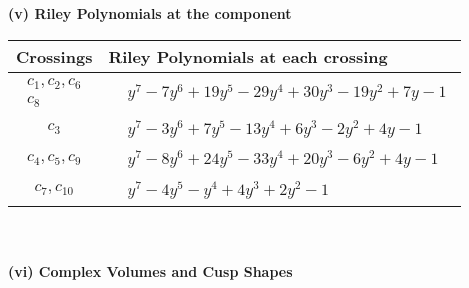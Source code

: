 \documentclass[1p]{elsarticle_modified}
\theoremstyle{definition}
\begin{document}
\flushleft \textbf{(v) Riley Polynomials at the component}\newline \\
\begin{tabular}{m{50pt}|m{274pt}}
Crossings & \hspace{64pt}Riley Polynomials at each crossing \\
\hline $$\begin{aligned}c_{1},c_{2},c_{6}\\c_{8}\end{aligned}$$&$\begin{aligned}
&y^7-7 y^6+19 y^5-29 y^4+30 y^3-19 y^2+7 y-1
\end{aligned}$\\
\hline $$\begin{aligned}c_{3}\end{aligned}$$&$\begin{aligned}
&y^7-3 y^6+7 y^5-13 y^4+6 y^3-2 y^2+4 y-1
\end{aligned}$\\
\hline $$\begin{aligned}c_{4},c_{5},c_{9}\end{aligned}$$&$\begin{aligned}
&y^7-8 y^6+24 y^5-33 y^4+20 y^3-6 y^2+4 y-1
\end{aligned}$\\
\hline $$\begin{aligned}c_{7},c_{10}\end{aligned}$$&$\begin{aligned}
&y^7-4 y^5- y^4+4 y^3+2 y^2-1
\end{aligned}$\\
\hline
\end{tabular}\\~\\
\newpage\flushleft \textbf{(vi) Complex Volumes and Cusp Shapes}
\end{document}
